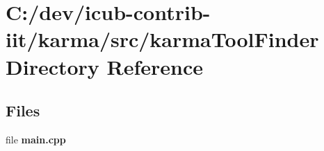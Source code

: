 \section{C\+:/dev/icub-\/contrib-\/iit/karma/src/karma\+Tool\+Finder Directory Reference}
\label{dir_29c9db2f94dd348f3d685c9fccd668c5}
\subsection*{Files}
\begin{DoxyCompactItemize}
\item 
file {\bfseries main.\+cpp}
\end{DoxyCompactItemize}
